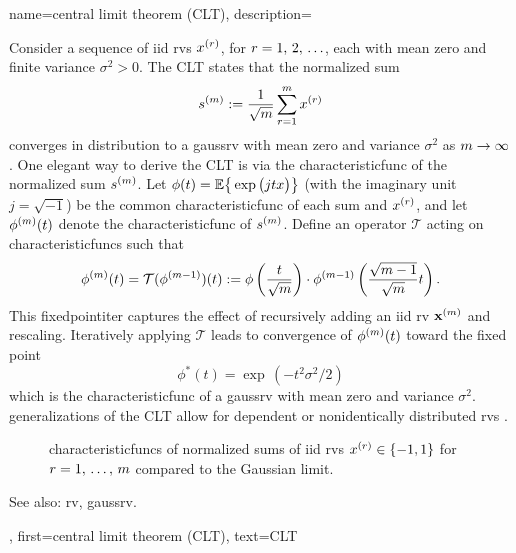 {name={central limit theorem (CLT)},
	description={Consider a sequence of \gls{iid} \glspl{rv} \( x^{(r)} \), for \( r = 1, \,2, \,\ldots \), 
		each with \gls{mean} zero and finite \gls{variance} \( \sigma^2 > 0 \). 
		The  CLT states that the normalized sum 
		\[
		s^{(m)} := \frac{1}{\sqrt{m}} \sum_{r = 1}^{m} x^{(r)} 
		\]
		converges in distribution to a \gls{gaussrv} with \gls{mean} zero and \gls{variance} \( \sigma^2 \) as \( m \to \infty \) \cite[Proposition~2.17]{AsympVanderVaartBook}.
		One elegant way to derive the CLT is via the \gls{characteristicfunc} of the normalized sum \( s^{(m)} \). 
		Let $ \phi(t) = \mathbb{E} \big\{ \exp \big( j t x \big) \big\}$ (with the imaginary unit $j = \sqrt{-1}$) 
		be the common \gls{characteristicfunc} of each sum and $x^{(r)}$, and let \( \phi^{(m)}(t) \) 
		denote the \gls{characteristicfunc} of \( s^{(m)} \). Define an operator \( \mathcal{T} \) acting on \glspl{characteristicfunc} 
		such that
		\[
		\phi^{(m)}(t) = \mathcal{T}(\phi^{(m-1)})(t) := \phi\left( \frac{t}{\sqrt{m}} \right) \cdot \phi^{(m-1)}\left( \frac{\sqrt{m-1}}{\sqrt{m}} t \right).
		\]
		This \gls{fixedpointiter} captures the effect of recursively adding an \gls{iid} \gls{rv} ${\bf x}^{(m)}$ 
		and rescaling. Iteratively applying \( \mathcal{T} \) leads to \gls{convergence} of \( \phi^{(m)}(t) \) toward the fixed point
		\[
		\phi^*(t) = \exp\,(-t^2 \sigma^2 / 2)
		\]
		which is the \gls{characteristicfunc} of a \gls{gaussrv} with \gls{mean} zero and \gls{variance} 
		\( \sigma^2 \). \Glspl{generalization} of the CLT allow for dependent or nonidentically distributed \glspl{rv} \cite[Sec.~2.8]{AsympVanderVaartBook}.
		\begin{figure}[H]
			\centering
			\caption{\Glspl{characteristicfunc} of normalized sums of \gls{iid} \glspl{rv} $x^{(r)} \in \{-1,1\}$ 
			for $r=1,\,\ldots,\,m$ compared to the Gaussian limit.}
		\end{figure}
		See also: \gls{rv}, \gls{gaussrv}.},
	first={central limit theorem (CLT)},
	text={CLT}
}


